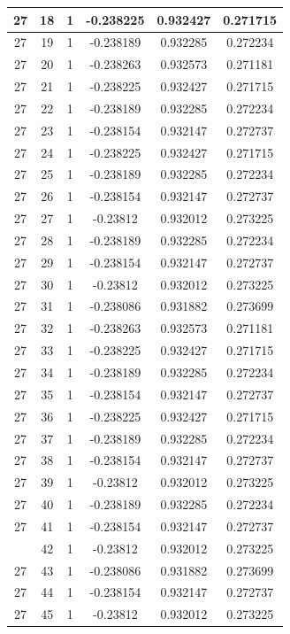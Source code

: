 \documentclass[12pt,a4paper]{article}
\numberwithin{equation}{section}
\numberwithin{figure}{section}
\numberwithin{table}{section}
\begin{document}
\begin{longtable}{|c|c|c|c|c|c|}
27 & 18 & 1 & -0.238225 & 0.932427 & 0.271715 \\ \hline
27 & 19 & 1 & -0.238189 & 0.932285 & 0.272234 \\ \hline
27 & 20 & 1 & -0.238263 & 0.932573 & 0.271181 \\ \hline
27 & 21 & 1 & -0.238225 & 0.932427 & 0.271715 \\ \hline
27 & 22 & 1 & -0.238189 & 0.932285 & 0.272234 \\ \hline
27 & 23 & 1 & -0.238154 & 0.932147 & 0.272737 \\ \hline
27 & 24 & 1 & -0.238225 & 0.932427 & 0.271715 \\ \hline
27 & 25 & 1 & -0.238189 & 0.932285 & 0.272234 \\ \hline
27 & 26 & 1 & -0.238154 & 0.932147 & 0.272737 \\ \hline
27 & 27 & 1 & -0.23812 & 0.932012 & 0.273225 \\ \hline
27 & 28 & 1 & -0.238189 & 0.932285 & 0.272234 \\ \hline
27 & 29 & 1 & -0.238154 & 0.932147 & 0.272737 \\ \hline
27 & 30 & 1 & -0.23812 & 0.932012 & 0.273225 \\ \hline
27 & 31 & 1 & -0.238086 & 0.931882 & 0.273699 \\ \hline
27 & 32 & 1 & -0.238263 & 0.932573 & 0.271181 \\ \hline
27 & 33 & 1 & -0.238225 & 0.932427 & 0.271715 \\ \hline
27 & 34 & 1 & -0.238189 & 0.932285 & 0.272234 \\ \hline
27 & 35 & 1 & -0.238154 & 0.932147 & 0.272737 \\ \hline
27 & 36 & 1 & -0.238225 & 0.932427 & 0.271715 \\ \hline
27 & 37 & 1 & -0.238189 & 0.932285 & 0.272234 \\ \hline
27 & 38 & 1 & -0.238154 & 0.932147 & 0.272737 \\ \hline
27 & 39 & 1 & -0.23812 & 0.932012 & 0.273225 \\ \hline
27 & 40 & 1 & -0.238189 & 0.932285 & 0.272234 \\ \hline
27 & 41 & 1 & -0.238154 & 0.932147 & 0.272737 \\ \hline
\pagebreak
27 & 42 & 1 & -0.23812 & 0.932012 & 0.273225 \\ \hline
27 & 43 & 1 & -0.238086 & 0.931882 & 0.273699 \\ \hline
27 & 44 & 1 & -0.238154 & 0.932147 & 0.272737 \\ \hline
27 & 45 & 1 & -0.23812 & 0.932012 & 0.273225 \\ \hline

\end{longtable}
\end{document}

